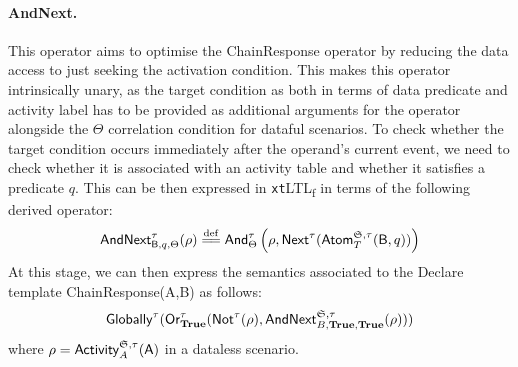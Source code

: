 \documentclass[sigconf]{acmart}
\newcommand{\eqdef}{\overset{\mathrm{def}}{=\joinrel=}}
\begin{document}
\paragraph{AndNext.} This operator aims to optimise the \textsf{ChainResponse} operator by reducing the data access to just seeking the activation condition. This makes this operator intrinsically unary, as the target condition as both in terms of data predicate and activity label has to be provided as additional arguments for the operator alongside the $\Theta$ correlation condition for dataful scenarios. To check whether the target condition occurs immediately after the operand's current event, we need to check whether it is associated with an activity table and whether it satisfies a predicate $q$. This can be then expressed in \texttt{xt}LTL\textsubscript{f} in terms of the following derived operator:
\begin{equation}\label{eq:andNext}
\textsf{AndNext}^\tau_{\textsf{B},q,\Theta}(\rho)\eqdef\textsf{And}^\tau_\Theta\left(\rho,\textsf{Next}^\tau(\textsf{Atom}^{\LOG,\tau}_{T}(\textsf{B},q))\right)
\end{equation}
At this stage, we can then express the semantics associated to the Declare template \textsf{ChainResponse(A,B)} as follows:
\begin{equation}\label{qp3}
    \textsf{Globally}^\tau(\textsf{Or}^\tau_\textbf{True}(\textsf{Not}^\tau(\rho),\textsf{AndNext}^{\mathfrak{S},\tau}_{B,\textbf{True},\textbf{True}}(\rho)))
\end{equation}
where $\rho=\textsf{Activity}^{\mathfrak{S},\tau}_A(\textsf{A})$ in a dataless scenario.
\medskip
\end{document}

